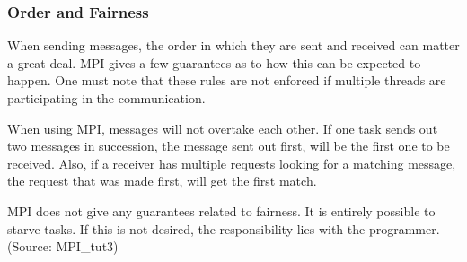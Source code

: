\subsubsection{Order and Fairness}
When sending messages, the order in which they are sent and received can matter a great deal. MPI gives a few guarantees as to how this can be expected to happen. One must note that these rules are not enforced if multiple threads are participating in the communication.

When using MPI, messages will not overtake each other. If one task sends out two messages in succession, the message sent out first, will be the first one to be received. Also, if a receiver has multiple requests looking for a matching message, the request that was made first, will get the first match.

MPI does not give any guarantees related to fairness. It is entirely possible to starve tasks. If this is not desired, the responsibility lies with the programmer.
(Source: MPI\_tut3)
